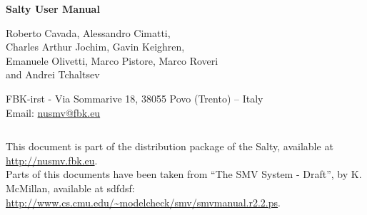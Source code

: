 \begin{titlepage}
\begin{center}
  \begin{Huge}
  \textbf{Salty User Manual}\\
  \end{Huge}
  \vspace{0.5cm}
  \vspace{4.0cm}

  \begin{Large}
    \begin{bf}
      Roberto Cavada, Alessandro Cimatti,\\ 
      Charles Arthur Jochim, Gavin Keighren,\\
      Emanuele Olivetti, Marco Pistore, Marco Roveri\\
      and Andrei Tchaltsev
    \end{bf}
  \end{Large}

  \vspace{1cm}
  {FBK-irst - Via Sommarive 18, 38055 Povo (Trento) -- Italy}\\

  \vspace{1cm}
  Email: \url{nusmv@fbk.eu}\\
  \vspace{4.0cm}
\end{center}
\vspace{1in}
\end{titlepage}



\newpage
\thispagestyle{empty}
$~~~~~~~~~~~~~~~~~~~~~~~~~~~~~~~~~~$\\
\vspace{15cm}

\noindent This document is part of the distribution package of the
Salty, available at \url{http://nusmv.fbk.eu}. \\


\noindent
Parts of this documents have been taken from ``The SMV System - Draft'', by
K. McMillan, available at sdfdsf: 
\url{http://www.cs.cmu.edu/\~modelcheck/smv/smvmanual.r2.2.ps}.\\

\noindent

